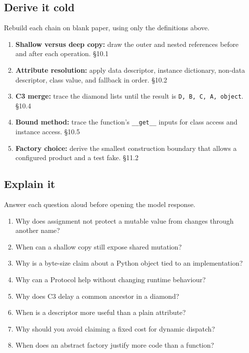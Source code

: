 \documentclass[11pt]{article}
\begin{document}
\begin{keepsection}
\section{Derive it cold}

Rebuild each chain on blank paper, using only the definitions above.

\begin{enumerate}
\item \textbf{Shallow versus deep copy:} draw the outer and nested references before and after each operation. \hfill{\small\color{FAUblue}§10.1}
\item \textbf{Attribute resolution:} apply data descriptor, instance dictionary, non-data descriptor, class value, and fallback in order. \hfill{\small\color{FAUblue}§10.2}
\item \textbf{C3 merge:} trace the diamond lists until the result is \texttt{D, B, C, A, object}. \hfill{\small\color{FAUblue}§10.4}
\item \textbf{Bound method:} trace the function’s \texttt{\_\_get\_\_} inputs for class access and instance access. \hfill{\small\color{FAUblue}§10.5}
\item \textbf{Factory choice:} derive the smallest construction boundary that allows a configured product and a test fake. \hfill{\small\color{FAUblue}§11.2}
\end{enumerate}
\end{keepsection}

\begin{keepsection}
\section{Explain it}

Answer each question aloud before opening the model response.

\begin{enumerate}
\item Why does assignment not protect a mutable value from changes through another name?
\item When can a shallow copy still expose shared mutation?
\item Why is a byte-size claim about a Python object tied to an implementation?
\item Why can a Protocol help without changing runtime behaviour?
\item Why does C3 delay a common ancestor in a diamond?
\item When is a descriptor more useful than a plain attribute?
\item Why should you avoid claiming a fixed cost for dynamic dispatch?
\item When does an abstract factory justify more code than a function?
\end{enumerate}

\end{keepsection}
\end{document}
